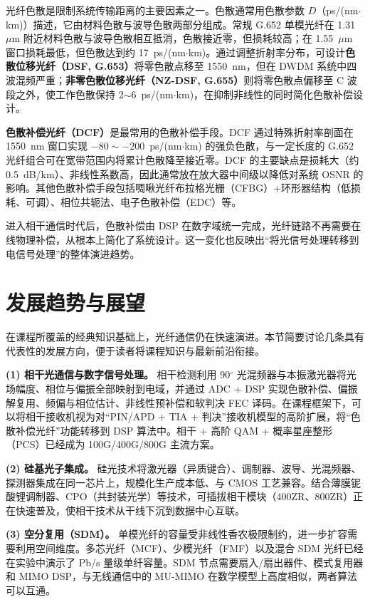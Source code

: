 \documentclass[a4paper,11pt,UTF8,fontset=fandol]{ctexart}
\begin{document}
光纤色散是限制系统传输距离的主要因素之一\cite{agrawal2010,essiambre2010}。色散通常用色散参数 $D$（ps/(nm$\cdot$km)）描述，它由材料色散与波导色散两部分组成。常规 G.652 单模光纤在 1.31~$\mu$m 附近材料色散与波导色散相互抵消，色散接近零，但损耗较高；在 1.55~$\mu$m 窗口损耗最低，但色散达到约 17~ps/(nm$\cdot$km)。通过调整折射率分布，可设计\textbf{色散位移光纤（DSF, G.653）}将零色散点移至 1550~nm，但在 DWDM 系统中四波混频严重；\textbf{非零色散位移光纤（NZ-DSF, G.655）}则将零色散点偏移至 C 波段之外，使工作色散保持 2$\sim$6~ps/(nm$\cdot$km)，在抑制非线性的同时简化色散补偿设计。

\textbf{色散补偿光纤（DCF）}是最常用的色散补偿手段。DCF 通过特殊折射率剖面在 1550~nm 窗口实现 $-80\sim-200$~ps/(nm$\cdot$km) 的强负色散，与一定长度的 G.652 光纤组合可在宽带范围内将累计色散降至接近零。DCF 的主要缺点是损耗大（约 0.5~dB/km）、非线性系数高，因此通常放在放大器中间级以降低对系统 OSNR 的影响。其他色散补偿手段包括啁啾光纤布拉格光栅（CFBG）+环形器结构（低损耗、可调）、相位共轭法、电子色散补偿（EDC）等。

进入相干通信时代后，色散补偿由 DSP 在数字域统一完成，光纤链路不再需要在线物理补偿，从根本上简化了系统设计。这一变化也反映出“将光信号处理转移到电信号处理”的整体演进趋势。

\section{发展趋势与展望}

在课程所覆盖的经典知识基础上，光纤通信仍在快速演进。本节简要讨论几条具有代表性的发展方向，便于读者将课程知识与最新前沿衔接。

\textbf{(1) 相干光通信与数字信号处理。} 相干检测利用 90$^{\circ}$ 光混频器与本振激光器将光场幅度、相位与偏振全部映射到电域，并通过 ADC + DSP 实现色散补偿、偏振解复用、频偏与相位估计、非线性预补偿和软判决 FEC 译码\cite{kikuchi2016}。在课程框架下，可以将相干接收机视为对“PIN/APD + TIA + 判决”接收机模型的高阶扩展，将“色散补偿光纤”功能转移到 DSP 算法中。相干 + 高阶 QAM + 概率星座整形（PCS）已经成为 100G/400G/800G 主流方案。

\textbf{(2) 硅基光子集成。} 硅光技术将激光器（异质键合）、调制器、波导、光混频器、探测器集成在同一芯片上，规模化生产成本低、与 CMOS 工艺兼容。结合薄膜铌酸锂调制器、CPO（共封装光学）等技术，可插拔相干模块（400ZR、800ZR）正在快速普及，使相干技术从干线下沉到数据中心互联。

\textbf{(3) 空分复用（SDM）。} 单模光纤的容量受非线性香农极限制约，进一步扩容需要利用空间维度。多芯光纤（MCF）、少模光纤（FMF）以及混合 SDM 光纤已经在实验中演示了 Pb/s 量级单纤容量。SDM 节点需要扇入/扇出器件、模式复用器和 MIMO DSP，与无线通信中的 MU-MIMO 在数学模型上高度相似，两者算法可以互通。
\end{document}
